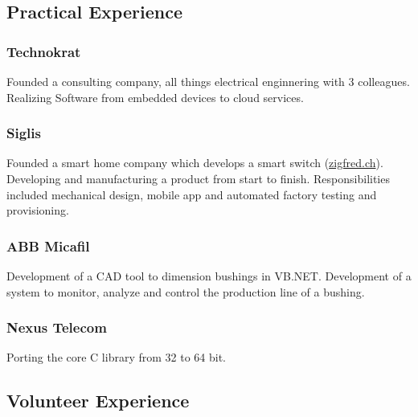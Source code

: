    \begin{timeline}
    
    
    \subsection{Practical Experience}
    
    \subsubsection{Technokrat}
    Founded a consulting company, all things electrical enginnering with 3 colleagues.
    Realizing Software from embedded devices to cloud services.
    \sectionsep

    \subsubsection{Siglis}
    Founded a smart home company which develops a smart switch (\href{https://zigfred.ch}{zigfred.ch}).
    Developing and manufacturing a product from start to finish. Responsibilities included mechanical design, mobile app and automated factory testing and provisioning.
    \sectionsep

    \subsubsection{ABB Micafil}
    Development of a CAD tool to dimension bushings in VB.NET.
    Development of a system to monitor, analyze and control the production line of a bushing.
    \sectionsep
    
    \subsubsection{Nexus Telecom}
    Porting the core C library from 32 to 64 bit.
    \sectionsep

    
    \subsection{Volunteer Experience}
    

\end{timeline}
